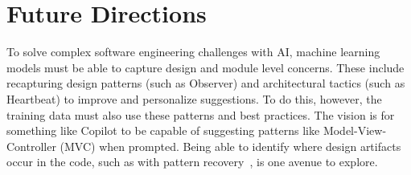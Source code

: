 \section{Future Directions}
\label{future}
To solve complex software engineering challenges with AI, machine learning models must be able to capture design and module level concerns. 
These include recapturing design patterns (such as Observer) and architectural tactics (such as Heartbeat) to improve and personalize suggestions. 
To do this, however, the training data must also use these patterns and best practices.
The vision is for something like Copilot to be capable of suggesting patterns like Model-View-Controller (MVC) when prompted. 
Being able to identify where design artifacts occur in the code, such as with pattern recovery~\cite{Keim2020}, is one avenue to explore. 